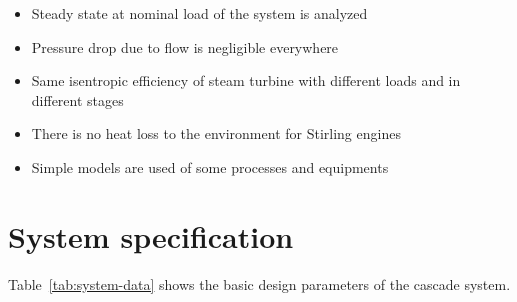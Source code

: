 \documentclass{article}
\begin{document}
\begin{itemize}
	\item Steady state at nominal load of the system is analyzed
	\item Pressure drop due to flow is negligible everywhere
	\item Same isentropic efficiency of steam turbine with different loads and in different stages
	\item There is no heat loss to the environment for Stirling engines
	\item Simple models are used of some processes and equipments	
\end{itemize}

\section{System specification}
Table~\ref{tab:system-data} shows the basic design parameters of the cascade system.
\end{document}

